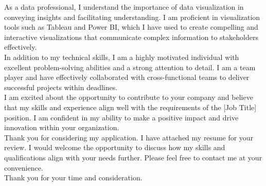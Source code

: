 \documentclass[11pt, a4paper]{awesome-cv}
\begin{document}
\begin{cvletter}
As a data professional, I understand the importance of data visualization in conveying insights and facilitating understanding. I am proficient in visualization tools such as Tableau and Power BI, which I have used to create compelling and interactive visualizations that communicate complex information to stakeholders effectively.\\
In addition to my technical skills, I am a highly motivated individual with excellent problem-solving abilities and a strong attention to detail. I am a team player and have effectively collaborated with cross-functional teams to deliver successful projects within deadlines.\\
I am excited about the opportunity to contribute to your company and believe that my skills and experience align well with the requirements of the [Job Title] position. I am confident in my ability to make a positive impact and drive innovation within your organization.\\
Thank you for considering my application. I have attached my resume for your review. I would welcome the opportunity to discuss how my skills and qualifications align with your needs further. Please feel free to contact me at your convenience.\\
Thank you for your time and consideration.





\end{cvletter}
\end{document}

